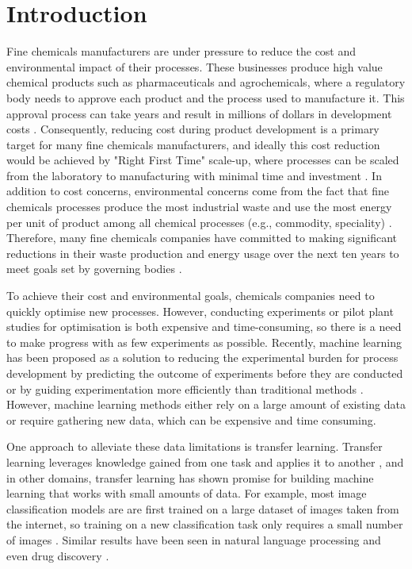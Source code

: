 \chapter{Introduction}\label{ch:introduction}

Fine chemicals manufacturers are under pressure to reduce the cost and environmental impact of their processes. These businesses produce high value chemical products such as pharmaceuticals and agrochemicals, where a regulatory body needs to approve each product and the process used to manufacture it. This approval process can take years and result in millions of dollars in development costs \cite{Prasad2017}. Consequently, reducing cost during product development is a primary target for many fine chemicals manufacturers, and ideally this cost reduction would be achieved by "Right First Time" scale-up, where processes can be scaled from the laboratory to manufacturing with minimal time and investment \cite{Poechlauer2013}. In addition to cost concerns, environmental concerns come from the fact that fine chemicals processes produce the most industrial waste and use the most energy per unit of product among all chemical processes (e.g., commodity, speciality) \cite{Sheldon2018}. Therefore, many fine chemicals companies have committed to making significant reductions in their waste production and energy usage over the next ten years to meet goals set by governing bodies \cite{BASF2020}.

To achieve their cost and environmental goals, chemicals companies need to quickly optimise new processes. However, conducting experiments or pilot plant studies for optimisation is both expensive and time-consuming, so there is a need to make progress with as few experiments as possible. Recently, machine learning has been proposed as a solution to reducing the experimental burden for process development by predicting the outcome of experiments before they are conducted \cite{Ramakrishnan2014, Sivaraman2019} or by guiding experimentation more efficiently than traditional methods \cite{Schweidtmann2018}.  However, machine learning methods either rely on a large amount of existing data or require gathering new data, which can be expensive and time consuming.

One approach to alleviate these data limitations is transfer learning. Transfer learning leverages knowledge gained from one task and applies it to another \cite{Zhuang2021}, and in other domains, transfer learning has shown promise for building machine learning that works with small amounts of data. For example, most image classification models are are first trained on a large dataset of images taken from the internet, so training on a new classification task only requires a small number of images \cite{He2016}. Similar results have been seen in natural language processing \cite{Brown2020} and even drug discovery \cite{Ramsundar2017}. 

